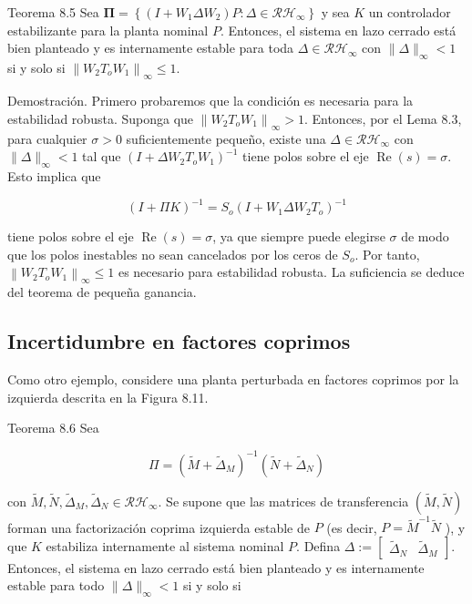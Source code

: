 Teorema 8.5 Sea $\boldsymbol{\Pi}=\left\{\left(I+W_{1} \Delta W_{2}\right) P: \Delta \in \mathcal{R} \mathcal{H}_{\infty}\right\}$ y sea $K$ un controlador estabilizante para la planta nominal $P$. Entonces, el sistema en lazo cerrado está bien planteado y es internamente estable para toda $\Delta \in \mathcal{R} \mathcal{H}_{\infty}$ con $\|\Delta\|_{\infty}<1$ si y solo si $\left\|W_{2} T_{o} W_{1}\right\|_{\infty} \leq 1$.

Demostración. Primero probaremos que la condición es necesaria para la estabilidad robusta. Suponga que $\left\|W_{2} T_{o} W_{1}\right\|_{\infty}>1$. Entonces, por el Lema 8.3, para cualquier $\sigma>0$ suficientemente pequeño, existe una $\Delta \in \mathcal{R} \mathcal{H}_{\infty}$ con $\|\Delta\|_{\infty}<1$ tal que $\left(I+\Delta W_{2} T_{o} W_{1}\right)^{-1}$ tiene polos sobre el eje $\operatorname{Re}(s)=\sigma$. Esto implica que

$$
(I+\Pi K)^{-1}=S_{o}\left(I+W_{1} \Delta W_{2} T_{o}\right)^{-1}
$$

tiene polos sobre el eje $\operatorname{Re}(s)=\sigma$, ya que siempre puede elegirse $\sigma$ de modo que los polos inestables no sean cancelados por los ceros de $S_{o}$. Por tanto, $\left\|W_{2} T_{o} W_{1}\right\|_{\infty} \leq 1$ es necesario para estabilidad robusta. La suficiencia se deduce del teorema de pequeña ganancia.

\subsection*{Incertidumbre en factores coprimos}
Como otro ejemplo, considere una planta perturbada en factores coprimos por la izquierda descrita en la Figura 8.11.


Teorema 8.6 Sea

$$
\Pi=\left(\tilde{M}+\tilde{\Delta}_{M}\right)^{-1}\left(\tilde{N}+\tilde{\Delta}_{N}\right)
$$

con $\tilde{M}, \tilde{N}, \tilde{\Delta}_{M}, \tilde{\Delta}_{N} \in \mathcal{R} \mathcal{H}_{\infty}$. Se supone que las matrices de transferencia $(\tilde{M}, \tilde{N})$ forman una factorización coprima izquierda estable de $P$ (es decir, $P=\tilde{M}^{-1} \tilde{N}$ ), y que $K$ estabiliza internamente al sistema nominal $P$. Defina $\Delta:=\left[\begin{array}{cc}\tilde{\Delta}_{N} & \tilde{\Delta}_{M}\end{array}\right]$. Entonces, el sistema en lazo cerrado está bien planteado y es internamente estable para todo $\|\Delta\|_{\infty}<1$ si y solo si

